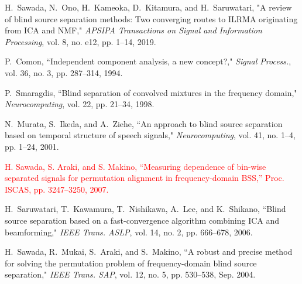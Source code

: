 \documentclass[honka]{nitkagawathesis}%
\newcommand{\red}[1]{\textcolor{red}{#1}}
\begin{document}










\backmatter



\begin{thebibliography}{99}
  
  H.~Sawada, N.~Ono, H.~Kameoka, D.~Kitamura, and H.~Saruwatari, "A review of blind source separation methods: Two converging routes to ILRMA originating from ICA and NMF," {\em APSIPA Transactions on Signal and Information Processing}, vol. 8, no. e12, pp. 1–14, 2019.
  
  P.~Comon, ``Independent component analysis, a new concept?," {\em Signal Process.}, vol. 36, no. 3, pp. 287--314, 1994.
  
  P.~Smaragdis, ``Blind separation of convolved mixtures in the frequency domain," {\em Neurocomputing}, vol. 22, pp. 21--34, 1998.
  
  N.~Murata, S.~Ikeda, and A.~Ziehe, ``An approach to blind source separation based on temporal structure of speech signals,"  {\em Neurocomputing}, vol. 41, no. 1–4, pp. 1--24, 2001.
  
  \red{H. Sawada, S. Araki, and S. Makino, ``Measuring dependence of bin-wise separated signals for permutation alignment in frequency-domain BSS,'' Proc. ISCAS, pp. 3247--3250, 2007.}
  
  H.~Saruwatari, T.~Kawamura, T.~Nishikawa, A.~Lee, and K.~Shikano, ``Blind source separation based on a fast-convergence algorithm combining ICA and beamforming,"  {\em IEEE Trans. ASLP}, vol. 14, no. 2, pp. 666--678, 2006.
  
  H.~Sawada, R.~Mukai, S.~Araki, and S.~Makino, ``A robust and precise method for solving the permutation problem of frequency-domain blind source separation,"  {\em IEEE Trans. SAP}, vol. 12, no. 5, pp. 530--538, Sep. 2004.
  

\end{thebibliography}
\end{document}
